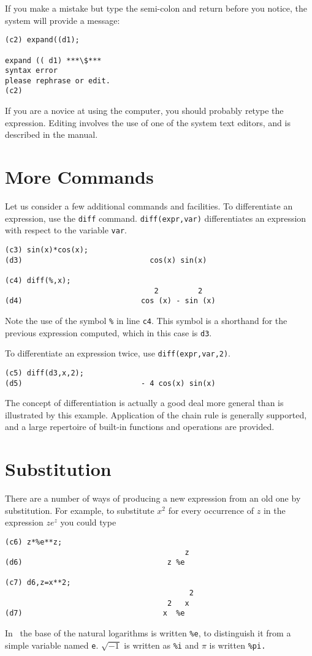 If you make a mistake but type the semi-colon and return before you notice,
the system will provide a message:
\begin{verbatim}
(c2) expand((d1);

expand (( d1) ***\$***
syntax error
please rephrase or edit.
(c2)
\end{verbatim}
If you are a novice at using the computer, you should probably
retype the expression.  Editing involves the use of one of the system
text editors, and is described in the manual.

\section{More Commands}

Let us consider a few additional commands and facilities.  To differentiate 
an expression, use the {\tt diff} command.  {\tt diff(expr,var)} 
differentiates an expression with respect to the variable {\tt var}. 
\begin{verbatim}
(c3) sin(x)*cos(x);
(d3)                             cos(x) sin(x)

(c4) diff(%,x);
                                  2         2
(d4)                           cos (x) - sin (x)
\end{verbatim}

Note the use of the symbol {\tt \%} in line {\tt c4}.  This symbol is a 
shorthand for the previous expression computed, which in this case is {\tt d3}.

To differentiate an expression twice, use {\tt diff(expr,var,2)}.
\begin{verbatim}
(c5) diff(d3,x,2);
(d5)                           - 4 cos(x) sin(x)
\end{verbatim}
The concept of differentiation is actually a good deal more general than is
illustrated by this example.  Application of the chain rule is generally supported, and
a large repertoire of built-in functions and operations are provided.

\section{Substitution}

There are a number of ways of producing a new expression from an
old one by substitution.
For example, to substitute $x^2 $ for every occurrence of $z$ in
the expression $ z e^z $ you could type
\begin{verbatim}
(c6) z*%e**z;
                                         z
(d6)                                 z %e

(c7) d6,z=x**2;
                                          2
                                     2   x
(d7)                                x  %e
\end{verbatim}
In \Max\, the base of the natural logarithms is written {\tt \%e}, to 
distinguish it from a simple variable named {\tt e}. $ \sqrt{-1}$ is written 
as {\tt \%i} and $\pi $ is written {\tt \%pi.}

